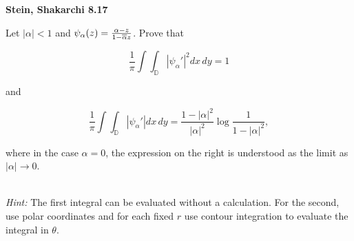 \textbf{Stein, Shakarchi 8.17}

Let $|\alpha| < 1$ and $\psi_{\alpha}(z) = \frac{\alpha - z}{1 - \overline{\alpha} z}$. Prove that 

$$
\frac{1}{\pi} \int\int_{\mathbb{D}} \left| \psi_{\alpha}' \right|^2 dx \, dy = 1
$$

and 

$$
\frac{1}{\pi} \int\int_{\mathbb{D}} \left| \psi_{\alpha}' \right| dx \, dy = \frac{1 - |\alpha|^2}{|\alpha|^2} \log{\frac{1}{1 - |\alpha|^2}},
$$

where in the case $\alpha = 0$, the expression on the right is understood as the limit as $|\alpha| \to 0$.

\ \\
\textit{Hint:} The first integral can be evaluated without a calculation. For the second, use polar coordinates and for
each fixed $r$ use contour integration to evaluate the integral in $\theta$.

\begin{solution}
  \ \\
\end{solution}
